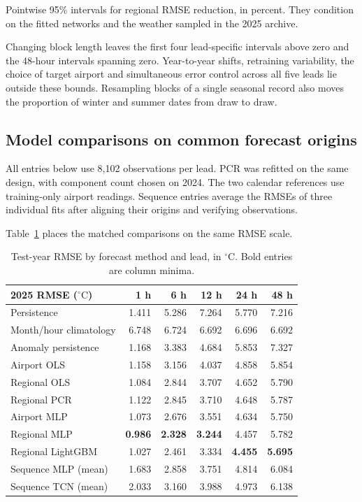 \documentclass[11pt,letterpaper]{article}
\newcommand{\thead}[1]{\textbf{#1}}\newcommand{\bestscore}[1]{\textbf{#1}}
\newcommand{\celsius}{\ensuremath{^{\circ}\mathrm{C}}}\newcommand{\code}[1]{\texttt{\small #1}}
\begin{document}
Pointwise 95\% intervals for regional RMSE reduction, in percent. They condition on the fitted networks and the weather sampled in the 2025 archive.

Changing block length leaves the first four lead-specific intervals above zero and the 48-hour intervals spanning zero. Year-to-year shifts, retraining variability, the choice of target airport and simultaneous error control across all five leads lie outside these bounds. Resampling blocks of a single seasonal record also moves the proportion of winter and summer dates from draw to draw.


\subsection{Model comparisons on common forecast origins}\label{comparison}
All entries below use 8,102 observations per lead. PCR was refitted on the same design, with component count chosen on 2024. The two calendar references use training-only airport readings. Sequence entries average the RMSEs of three individual fits after aligning their origins and verifying observations.

Table~\ref{tab:models} places the matched comparisons on the same RMSE scale.



\begin{table}[!htbp]
\centering\small
\caption{Test-year RMSE by forecast method and lead, in \celsius. Bold entries are column minima.}\label{tab:models}
\renewcommand{\arraystretch}{1.12}\begin{tabular*}{.98\linewidth}{@{\extracolsep{\fill}}lrrrrr@{}}\toprule\thead{2025 RMSE (\celsius)}&\thead{1 h}&\thead{6 h}&\thead{12 h}&\thead{24 h}&\thead{48 h}\\\midrule
Persistence & 1.411 & 5.286 & 7.264 & 5.770 & 7.216 \\
Month/hour climatology & 6.748 & 6.724 & 6.692 & 6.696 & 6.692 \\
Anomaly persistence & 1.168 & 3.383 & 4.684 & 5.853 & 7.327 \\
Airport OLS & 1.158 & 3.156 & 4.037 & 4.858 & 5.854 \\
Regional OLS & 1.084 & 2.844 & 3.707 & 4.652 & 5.790 \\
Regional PCR & 1.122 & 2.845 & 3.710 & 4.648 & 5.787 \\
Airport MLP & 1.073 & 2.676 & 3.551 & 4.634 & 5.750 \\
Regional MLP & \bestscore{0.986} & \bestscore{2.328} & \bestscore{3.244} & 4.457 & 5.782 \\
Regional LightGBM & 1.027 & 2.461 & 3.334 & \bestscore{4.455} & \bestscore{5.695} \\
Sequence MLP (mean) & 1.683 & 2.858 & 3.751 & 4.814 & 6.084 \\
Sequence TCN (mean) & 2.033 & 3.160 & 3.988 & 4.973 & 6.138 \\
\bottomrule\end{tabular*}
\end{table}
\end{document}
